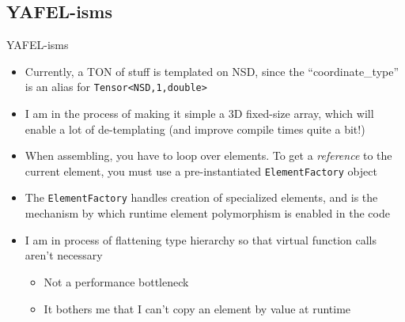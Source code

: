 \subsection{YAFEL-isms}

\begin{frame}{YAFEL-isms}

  \begin{itemize} 
  \item
    Currently, a TON of stuff is templated on NSD, since the
    ``coordinate\_type'' is an alias for \texttt{Tensor\textless NSD,1,double\textgreater}
  \item
    I am in the process of making it simple a 3D fixed-size array, which will enable
    a lot of de-templating (and improve compile times quite a bit!)
  \item
    When assembling, you have to loop over elements. To get a \emph{reference} to
    the current element, you must use a pre-instantiated \texttt{ElementFactory} object
  \item
    The \texttt{ElementFactory} handles creation of specialized elements, and is the
    mechanism by which runtime element polymorphism is enabled in the code
  \item
    I am in process of flattening type hierarchy so that virtual function calls aren't necessary
    \begin{itemize}
    \item
      Not a performance bottleneck
    \item
      It bothers me that I can't copy an element by value at runtime
    \end{itemize}
  \end{itemize}
\end{frame}
